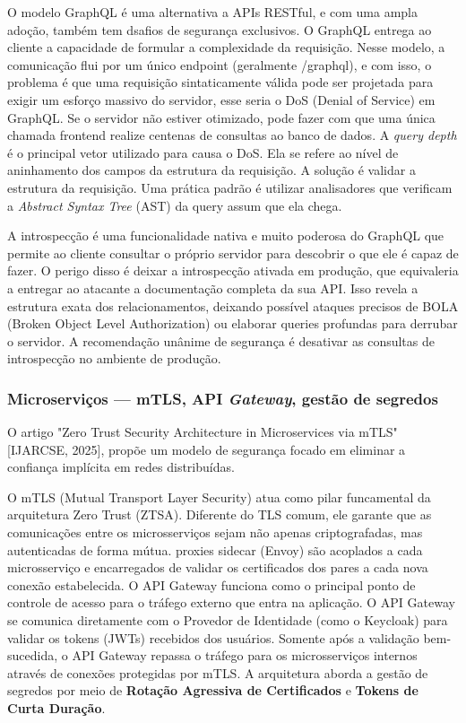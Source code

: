 {O modelo GraphQL é uma alternativa a APIs RESTful, e com uma ampla adoção, também tem dsafios de segurança exclusivos. O GraphQL entrega ao cliente a capacidade de formular a complexidade da requisição. Nesse modelo, a comunicação flui por um único endpoint (geralmente /graphql), e com isso, o problema é que uma requisição sintaticamente válida pode ser projetada para exigir um esforço massivo do servidor, esse seria o DoS (Denial of Service) em GraphQL. Se o servidor não estiver otimizado, pode fazer com que uma única chamada frontend realize centenas de consultas ao banco de dados. A \textit{query depth} é o principal vetor utilizado para causa o DoS. Ela se refere ao nível de aninhamento dos campos da estrutura da requisição. A solução é validar a estrutura da requisição. Uma prática padrão é utilizar analisadores que verificam a \textit{Abstract Syntax Tree} (AST) da query assum que ela chega.

A introspecção é uma funcionalidade nativa e muito poderosa do GraphQL que permite ao cliente consultar o próprio servidor para descobrir o que ele é capaz de fazer. O perigo disso é deixar a introspecção ativada em produção, que equivaleria a entregar ao atacante a documentação completa da sua API. Isso revela a estrutura exata dos relacionamentos, deixando possível ataques precisos de BOLA (Broken Object Level Authorization) ou elaborar queries profundas para derrubar o servidor. A recomendação unânime de segurança é desativar as consultas de introspecção no ambiente de produção.

\subsubsection{
    Microserviços — mTLS, API \textit{Gateway}, gestão de segredos
}\label{sec:microservicos}

O artigo "Zero Trust Security Architecture in Microservices via mTLS" [IJARCSE, 2025], propõe um modelo de segurança focado em eliminar a confiança implícita em redes distribuídas.

O mTLS (Mutual Transport Layer Security) atua como pilar funcamental da arquitetura Zero Trust (ZTSA). Diferente do TLS comum, ele garante que as comunicações entre os microsserviços sejam não apenas criptografadas, mas autenticadas de forma mútua. proxies sidecar (Envoy) são acoplados a cada microsserviço e encarregados de validar os certificados dos pares a cada nova conexão estabelecida. O API Gateway funciona como o principal ponto de controle de acesso para o tráfego externo que entra na aplicação. O API Gateway se comunica diretamente com o Provedor de Identidade (como o Keycloak) para validar os tokens (JWTs) recebidos dos usuários. Somente após a validação bem-sucedida, o API Gateway repassa o tráfego para os microsserviços internos através de conexões protegidas por mTLS. A arquitetura aborda a gestão de segredos por meio de \textbf{Rotação Agressiva de Certificados} e \textbf{Tokens de Curta Duração}. 

}
